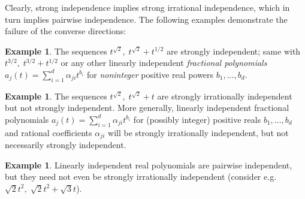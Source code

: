 \documentclass[11pt]{amsart}
\theoremstyle{definition}
\newtheorem{example}[lemma]{Example}
\newcommand{\1}{{\mathbf{1}}}
\begin{document}
Clearly, strong independence implies strong irrational independence,  %
which in turn implies pairwise independence. The following examples demonstrate the failure of the converse directions:
\begin{example}
    The sequences $t^{\sqrt{2}},\; t^{\sqrt{2}}+t^{1/2}$ are strongly independent; same with $t^{3/2},\; t^{3/2}+t^{1/2}$ or any other linearly independent \emph{fractional polynomials} $a_j(t) = \sum\limits_{i=1}^d \alpha_{ji}t^{b_i}$ for \emph{noninteger} positive real powers $b_1, \ldots, b_d$.
\end{example}
\begin{example}
    The sequences $t^{\sqrt{2}},\; t^{\sqrt{2}}+t$ are strongly irrationally independent but not strongly independent. More generally, linearly independent fractional polynomials $a_j(t) = \sum\limits_{i=1}^d \alpha_{ji}t^{b_i}$ for (possibly integer) positive reals $b_1, \ldots, b_d$ and rational coefficients $\alpha_{ji}$ will be strongly irrationally independent, but not necessarily strongly independent.
\end{example}
\begin{example}
    Linearly independent real polynomials are pairwise independent, but they need not even be strongly irrationally independent (consider e.g. $\sqrt{2}t^2,\; \sqrt{2}t^2 + \sqrt{3} t$).    
\end{example}
\end{document}
